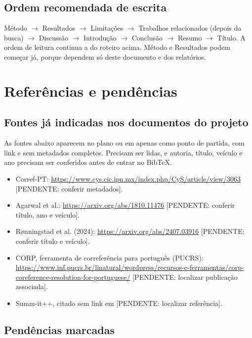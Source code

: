 \documentclass[11pt,a4paper]{article}
\newcommand{\pend}[1]{\textcolor{red!60!black}{[PENDENTE: #1]}}
\begin{document}
\subsection{Ordem recomendada de escrita}

Método $\rightarrow$ Resultados $\rightarrow$ Limitações $\rightarrow$ Trabalhos relacionados (depois da busca) $\rightarrow$ Discussão $\rightarrow$ Introdução $\rightarrow$ Conclusão $\rightarrow$ Resumo $\rightarrow$ Título. A ordem de leitura continua a do roteiro acima. Método e Resultados podem começar já, porque dependem só deste documento e dos relatórios.

\section{Referências e pendências}\label{sec:pendencias}

\subsection{Fontes já indicadas nos documentos do projeto}\label{sec:refs}

As fontes abaixo aparecem no plano ou em  apenas como ponto de partida, com link e sem metadados completos. Precisam ser lidas, e autoria, título, veículo e ano precisam ser conferidos antes de entrar no BibTeX.

\begin{itemize}
\item Corref-PT: \url{https://www.cys.cic.ipn.mx/index.php/CyS/article/view/3063} \pend{conferir metadados}.
\item Agarwal et al.: \url{https://arxiv.org/abs/1810.11476} \pend{conferir título, ano e veículo}.
\item Rønningstad et al. (2024): \url{https://arxiv.org/abs/2407.03916} \pend{conferir título e veículo}.
\item CORP, ferramenta de correferência para português (PUCRS): \url{https://www.inf.pucrs.br/linatural/wordpress/recursos-e-ferramentas/corp-coreference-resolution-for-portuguese/} \pend{localizar publicação associada}.
\item Summ-it++, citado sem link em  \pend{localizar referência}.
\end{itemize}

\subsection{Pendências marcadas}
\end{document}
